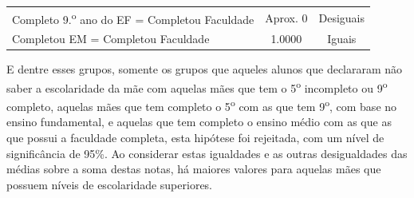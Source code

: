 \begin{table}[htb]
\begin{tabular}{lcc}
    Completo 9.\textsuperscript{o} ano do EF = Completou Faculdade & Aprox. 0 & Desiguais\\
    Completou EM = Completou Faculdade & 1.0000 & Iguais\\
    \bottomrule
    \end{tabular}
    \centering
    
  \end{table}

E dentre esses grupos, somente os grupos que aqueles alunos que declararam não saber a escolaridade da mãe com aquelas mães que tem o
5\textsuperscript{o} incompleto ou 9\textsuperscript{o} completo, aquelas mães que tem completo o 5\textsuperscript{o} com as que tem
9\textsuperscript{o}, com base no ensino fundamental, e aquelas que tem completo o ensino médio com as que as que possui a 
faculdade completa, esta hipótese foi rejeitada, com um nível de significância de 95\%. Ao considerar estas igualdades e 
as outras desigualdades das médias sobre a soma destas notas, há maiores valores para aquelas mães que possuem
níveis de escolaridade superiores.